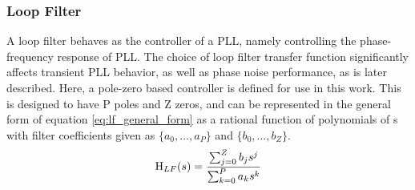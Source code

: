 

		\subsubsection{Loop Filter}
			A loop filter behaves as the controller of a PLL, namely controlling the phase-frequency response of PLL. The choice of loop filter transfer function significantly affects transient PLL behavior, as well as phase noise performance, as is later described. Here, a pole-zero based controller is defined for use in this work. This is designed to have P poles and Z zeros, and can be represented in the general form of equation \ref{eq:lf_general_form} as a rational function of polynomials of s with filter coefficients given as $\{a_0, ..., a_P\}$ and $\{b_0, ..., b_Z\}$.
			\begin{equation} \label{eq:lf_general_form}
				\textnormal{H}_{LF}(s) = \frac{\sum_{j=0}^Z b_js^j}{\sum_{k=0}^P a_ks^k}
			\end{equation}
			
